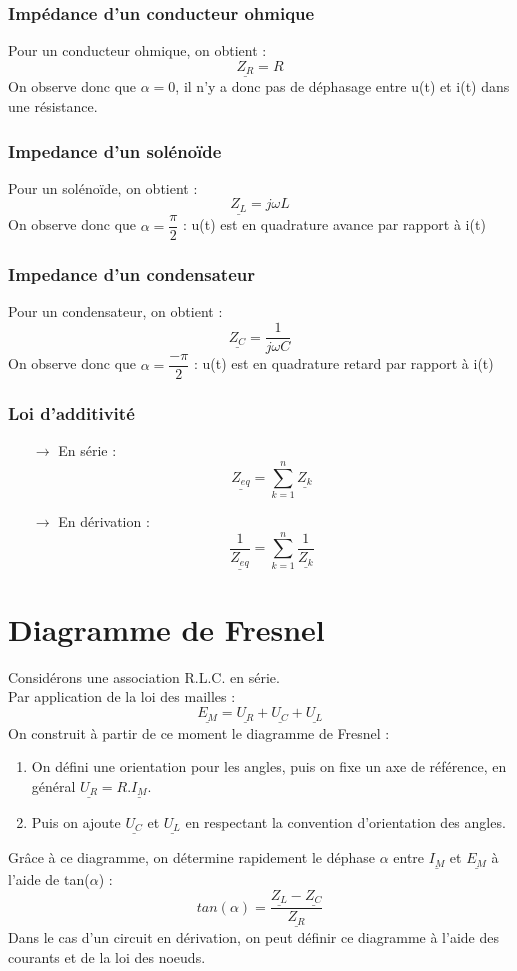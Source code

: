 \subsubsection{Impédance d'un conducteur ohmique}
Pour un conducteur ohmique, on obtient :
$$\underline{Z_R} = R$$
On observe donc que $\alpha = 0$, il n'y a donc pas de déphasage entre u(t) et i(t) dans une résistance.
\subsubsection{Impedance d'un solénoïde}
Pour un solénoïde, on obtient :
$$\underline{Z_L} = j\omega L$$
On observe donc que $\alpha = \dfrac{\pi}{2}$ : u(t) est en quadrature avance par rapport à i(t)
\subsubsection{Impedance d'un condensateur}
Pour un condensateur, on obtient :
$$\underline{Z_C} = \dfrac{1}{j\omega C}$$
On observe donc que $\alpha = \dfrac{-\pi}{2}$ : u(t) est en quadrature retard par rapport à i(t)
\subsubsection{Loi d'additivité}
\begin{itemize}
 \item[$\rightarrow$] En série : $$\underline{Z_{eq}} = \sum_{k=1}^n \underline{Z_k}$$
 \item[$\rightarrow$] En dérivation : $$\underline{\dfrac{1}{Z_{eq}}} = \sum_{k=1}^n \dfrac{1}{\underline{Z_k}}$$
\end{itemize}
\section{Diagramme de Fresnel}
Considérons une association R.L.C. en série.\\
Par application de la loi des mailles :
$$\underline{E_M} = \underline{U_R} + \underline{U_C} +\underline{U_L}$$
On construit à partir de ce moment le diagramme de Fresnel :
\begin{enumerate}[1 -]
 \item On défini une orientation pour les angles, puis on fixe un axe de référence, en général $\underline{U_R} = R.\underline{I_M}$.\\
 \item Puis on ajoute $\underline{U_C}$ et $\underline{U_L}$ en respectant la convention d'orientation des angles.
\end{enumerate}
Grâce à ce diagramme, on détermine rapidement le déphase $\alpha$ entre $\underline{I_M}$ et $\underline{E_M}$ à l'aide de tan($\alpha$) :
$$tan(\alpha) = \dfrac{\underline{Z_L}-\underline{Z_C}}{\underline{Z_R}}$$
Dans le cas d'un circuit en dérivation, on peut définir ce diagramme à l'aide des courants et de la loi des noeuds.
